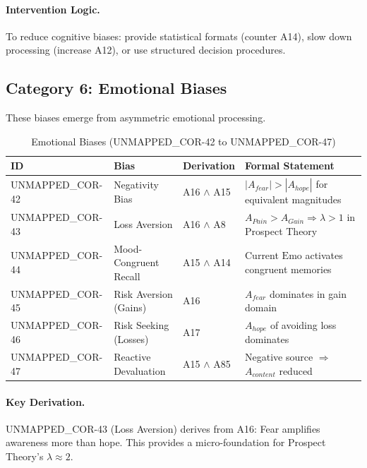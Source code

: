 \paragraph{Intervention Logic.} To reduce cognitive biases: provide statistical formats (counter A14), slow down processing (increase A12), or use structured decision procedures.


\subsection{Category 6: Emotional Biases}

These biases emerge from asymmetric emotional processing.

\begin{table}[htbp]
\small
\centering
\caption{Emotional Biases (UNMAPPED_COR-42 to UNMAPPED_COR-47)}
\label{tab:cor-emotional}
\begin{tabular}{p{1.2cm}p{2.8cm}p{3.8cm}p{5cm}}
\toprule
\textbf{ID} & \textbf{Bias} & \textbf{Derivation} & \textbf{Formal Statement} \\
\midrule
UNMAPPED_COR-42 & Negativity Bias & A16 $\land$ A15 & $|A_{fear}| > |A_{hope}|$ for equivalent magnitudes \\
UNMAPPED_COR-43 & Loss Aversion & A16 $\land$ A8 & $A_{Pain} > A_{Gain} \Rightarrow \lambda > 1$ in Prospect Theory \\
UNMAPPED_COR-44 & Mood-Congruent Recall & A15 $\land$ A14 & Current $\text{Emo}$ activates congruent memories \\
UNMAPPED_COR-45 & Risk Aversion (Gains) & A16 & $A_{fear}$ dominates in gain domain \\
UNMAPPED_COR-46 & Risk Seeking (Losses) & A17 & $A_{hope}$ of avoiding loss dominates \\
UNMAPPED_COR-47 & Reactive Devaluation & A15 $\land$ A85 & Negative source $\Rightarrow$ $A_{content}$ reduced \\
\bottomrule
\end{tabular}
\end{table}

\paragraph{Key Derivation.} UNMAPPED_COR-43 (Loss Aversion) derives from A16: Fear amplifies awareness more than hope. This provides a micro-foundation for Prospect Theory's $\lambda \approx 2$.


